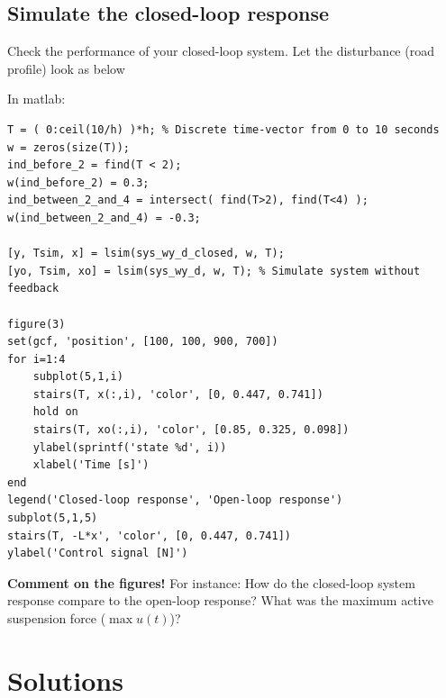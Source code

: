 \documentclass[a4paper]{scrartcl}
\begin{document}
\subsection*{Simulate the closed-loop response}
\label{sec-2-5}
Check the performance of your closed-loop system. Let the disturbance (road profile) look as below
\begin{center}
   \end{center}

In matlab:
\begin{verbatim}
T = ( 0:ceil(10/h) )*h; % Discrete time-vector from 0 to 10 seconds
w = zeros(size(T));
ind_before_2 = find(T < 2);
w(ind_before_2) = 0.3;
ind_between_2_and_4 = intersect( find(T>2), find(T<4) );
w(ind_between_2_and_4) = -0.3;

[y, Tsim, x] = lsim(sys_wy_d_closed, w, T);
[yo, Tsim, xo] = lsim(sys_wy_d, w, T); % Simulate system without feedback

figure(3)
set(gcf, 'position', [100, 100, 900, 700])
for i=1:4
    subplot(5,1,i)
    stairs(T, x(:,i), 'color', [0, 0.447, 0.741])
    hold on
    stairs(T, xo(:,i), 'color', [0.85, 0.325, 0.098])
    ylabel(sprintf('state %d', i))
    xlabel('Time [s]')
end
legend('Closed-loop response', 'Open-loop response')
subplot(5,1,5)
stairs(T, -L*x', 'color', [0, 0.447, 0.741])
ylabel('Control signal [N]')
\end{verbatim}

\textbf{Comment on the figures!} For instance: How do the closed-loop system response compare to the open-loop response? What was the maximum active suspension force (\(\max u(t)\))? 


\section*{Solutions}
\label{sec-3}
\end{document}
